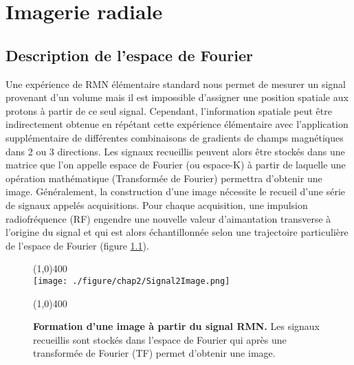 \chapter{Imagerie radiale}
\setlength{\footskip}{50pt}
\label{Chap2}
\section{Description de l'espace de Fourier}

Une expérience de RMN élémentaire standard nous permet de mesurer un signal provenant d'un volume mais il est impossible d'assigner une position spatiale aux protons à partir de ce seul signal. Cependant, l'information spatiale peut être indirectement obtenue en répétant cette expérience élémentaire avec l'application supplémentaire de différentes combinaisons de gradients de champs magnétiques dans 2 ou 3 directions. Les signaux recueillis peuvent alors être stockés dans une matrice que l'on appelle espace de Fourier (ou espace-K) à partir de laquelle une opération mathématique (Transformée de Fourier) permettra d'obtenir une image. 
Généralement, la construction d'une image nécessite le recueil d'une série de signaux appelés acquisitions. Pour chaque acquisition, une impulsion radiofréquence (RF) engendre une nouvelle valeur d'aimantation transverse à l'origine du signal et qui est alors échantillonnée selon une trajectoire particulière de l'espace de Fourier (figure \ref{fig:Signal2Image}).


\begin{figure}[h]
\centering
\line(1,0){400} \\
\texttt{[image: ./figure/chap2/Signal2Image.png]}
\caption[Formation d'une image à partir de signal RMN]{\label{fig:Signal2Image} \textbf{Formation d'une image à partir du signal RMN.} Les signaux recueillis sont stockés dans l'espace de Fourier qui après une transformée de Fourier (TF) permet d'obtenir une image. }
\line(1,0){400} \\
\end{figure}



